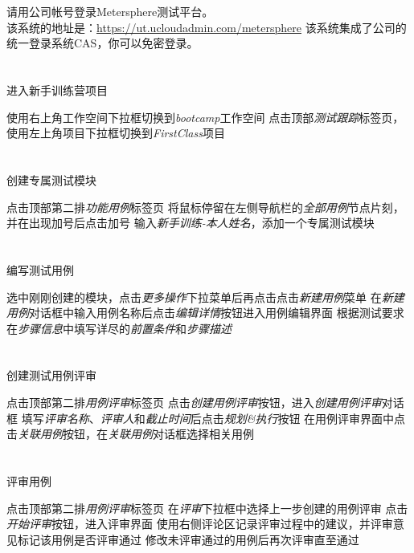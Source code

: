\documentclass[12pt,addpoints,fleqn]{exam}
\begin{document}
\begin{questions}
\begin{parts}
  请用公司帐号登录Metersphere测试平台。\\
  该系统的地址是：\href{https://ut.ucloudadmin.com/metersphere}{https://ut.ucloudadmin.com/metersphere}
  该系统集成了公司的统一登录系统CAS，你可以免密登录。
  
  \part{}进入新手训练营项目
  \begin{subparts}
    \subpart{}使用右上角工作空间下拉框切换到\emph{bootcamp}工作空间
    \subpart{}点击顶部\emph{测试跟踪}标签页，使用左上角项目下拉框切换到\emph{FirstClass}项目
  \end{subparts}

  \part{}创建专属测试模块
  \begin{subparts}
    \subpart{}点击顶部第二排\emph{功能用例}标签页
    \subpart{}将鼠标停留在左侧导航栏的\emph{全部用例}节点片刻，并在出现加号后点击加号
    \subpart{}输入\emph{新手训练-本人姓名}，添加一个专属测试模块
  \end{subparts}

  \part{}编写测试用例
  \begin{subparts}
    \subpart{}选中刚刚创建的模块，点击\emph{更多操作}下拉菜单后再点击点击\emph{新建用例}菜单
    \subpart{}在\emph{新建用例}对话框中输入用例名称后点击\emph{编辑详情}按钮进入用例编辑界面
    \subpart{}根据测试要求在\emph{步骤信息}中填写详尽的\emph{前置条件}和\emph{步骤描述}
  \end{subparts}

  \part{}创建测试用例评审
  \begin{subparts}
    \subpart{}点击顶部第二排\emph{用例评审}标签页
    \subpart{}点击\emph{创建用例评审}按钮，进入\emph{创建用例评审}对话框
    \subpart{}填写\emph{评审名称}、\emph{评审人}和\emph{截止时间}后点击\emph{规划\&执行}按钮
    \subpart{}在用例评审界面中点击\emph{关联用例}按钮，在\emph{关联用例}对话框选择相关用例
  \end{subparts}

  \part{}评审用例
  \begin{subparts}
    \subpart{}点击顶部第二排\emph{用例评审}标签页
    \subpart{}在\emph{评审}下拉框中选择上一步创建的用例评审
    \subpart{}点击\emph{开始评审}按钮，进入评审界面
    \subpart{}使用右侧评论区记录评审过程中的建议，并评审意见标记该用例是否评审通过
    \subpart{}修改未评审通过的用例后再次评审直至通过
  \end{subparts}


\end{parts}
\end{questions}
\end{document}
